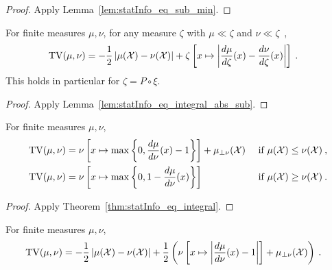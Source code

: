 \begin{proof}%
{}
Apply Lemma~\ref{lem:statInfo_eq_sub_min}.
\end{proof}


\begin{lemma}
  \label{lem:tv_eq_integral_abs_sub}
  For finite measures $\mu, \nu$, for any measure $\zeta$ with $\mu \ll \zeta$ and $\nu \ll \zeta$~,
  \begin{align*}
  \operatorname{TV}(\mu, \nu)
  &= - \frac{1}{2} \left\vert \mu(\mathcal X) - \nu(\mathcal X) \right\vert + 
    \zeta\left[x \mapsto \left\vert \frac{d \mu}{d\zeta}(x) - \frac{d \nu}{d\zeta}(x)\right\vert\right] 
  \: .
  \end{align*}
  This holds in particular for $\zeta = P \circ \xi$.
\end{lemma}

\begin{proof}%
{}
Apply Lemma~\ref{lem:statInfo_eq_integral_abs_sub}.
\end{proof}


\begin{lemma}
  \label{lem:tv_eq_integral}
  For finite measures $\mu, \nu$,
  \begin{align*}
  \operatorname{TV}(\mu, \nu)
  &= \nu\left[ x \mapsto \max \left\{0 , \frac{d \mu}{d\nu}(x) - 1 \right\} \right] + \mu_{\perp \nu}(\mathcal X) & \text{ if } \mu(\mathcal X) \le \nu(\mathcal X)
  \: , \\
  \operatorname{TV}(\mu, \nu)
  &= \nu\left[ x \mapsto \max \left\{0 , 1 - \frac{d \mu}{d\nu}(x) \right\} \right] & \text{ if } \mu(\mathcal X) \ge \nu(\mathcal X)
  \: .
  \end{align*}
\end{lemma}

\begin{proof}%
{}
Apply Theorem~\ref{thm:statInfo_eq_integral}.
\end{proof}


\begin{lemma}
  \label{lem:tv_eq_integral_abs}
  For finite measures $\mu, \nu$,
  \begin{align*}
  \operatorname{TV}(\mu, \nu)
  &= -\frac{1}{2} \left\vert \mu(\mathcal X) - \nu(\mathcal X)\right\vert + \frac{1}{2}\left( \nu\left[ x \mapsto \left\vert \frac{d \mu}{d\nu}(x) - 1 \right\vert \right]  + \mu_{\perp \nu}(\mathcal X)\right)
  \: .
  \end{align*}
\end{lemma}

